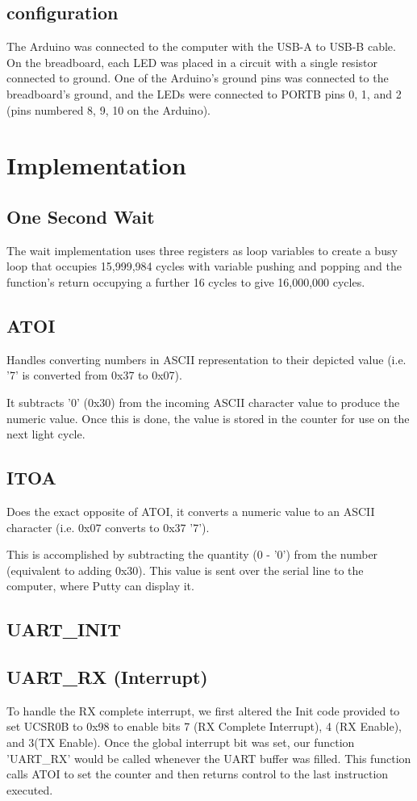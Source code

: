 \documentclass[letterpaper,11pt]{texMemo} %
\begin{document}
\subsection*{configuration}
The Arduino was connected to the computer with the USB-A to USB-B cable. On the breadboard, each LED was placed in a circuit with a single resistor connected to ground. One of the Arduino's ground pins was connected to the breadboard's ground, and the LEDs were connected to PORTB pins 0, 1, and 2 (pins numbered 8, 9, 10 on the Arduino).

\section*{Implementation}
\subsection*{One Second Wait}
The wait implementation uses three registers as loop variables to create a busy loop that occupies 15,999,984 cycles with variable pushing and popping and the function's return occupying a further 16 cycles to give 16,000,000 cycles.

\subsection*{ATOI}
Handles converting numbers in ASCII representation to their depicted value (i.e. '7' is converted from 0x37 to 0x07).

It subtracts '0' (0x30) from the incoming ASCII character value to produce the numeric value. Once this is done, the value is stored in the counter for use on the next light cycle.

\subsection*{ITOA}
Does the exact opposite of ATOI, it converts a numeric value to an ASCII character (i.e. 0x07 converts to 0x37 '7').

This is accomplished by subtracting the quantity (0 - '0') from the number (equivalent to adding 0x30). This value is sent over the serial line to the computer, where Putty can display it.

\subsection*{UART\_INIT}

\subsection*{UART\_RX (Interrupt)}
To handle the RX complete interrupt, we first altered the Init code provided to set UCSR0B to 0x98 to enable bits 7 (RX Complete Interrupt), 4 (RX Enable), and 3(TX Enable). Once the global interrupt bit was set, our function 'UART\_RX' would be called whenever the UART buffer was filled. This function calls ATOI to set the counter and then returns control to the last instruction executed.
\end{document}
